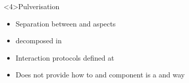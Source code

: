 \begin{frame}<4>{Pulverisation~\cite{DBLP:journals/fi/CasadeiPPVW20}}
  \begin{cardTiny}
    \begin{itemize}[<+->]
      \item Separation between  and  aspects
      \item {} decomposed in 
      \item Interaction protocols defined at 
      \item[\failure{\faThumbsDown}] Does not provide how to  and  component is a  and  way
    \end{itemize}
  \end{cardTiny}
  \begin{columns}
    \begin{column}{0.45\textwidth}
    \end{column}
    \begin{column}{0.38\textwidth}
    \end{column}
  \end{columns}
\end{frame}